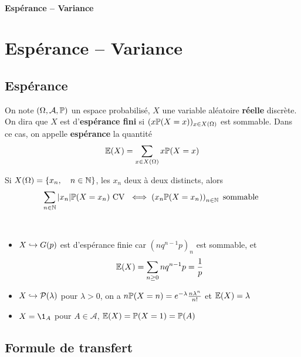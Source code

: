 \ifsolo
    ~

    \vspace{1cm}

    \begin{center}
        \textbf{\LARGE Espérance -- Variance} \\[1em]
    \end{center}
    \tableofcontents
\else
    \chapter{Espérance -- Variance}

    \minitoc
\fi
\thispagestyle{empty}

\section{Espérance}

\begin{dfn}
    On note $(\Omega, \mathcal  A, \P)$ un espace probabilisé, $X$ une variable aléatoire \textbf{réelle} discrète. On dira que $X$ est d'\textbf{espérance fini} si  $(x\P(X=x))_{x\in X(\Omega)}$ est sommable. Dans ce cas, on appelle \textbf{espérance} la quantité \[
        \E(X)= \sum_{x \in  X(\Omega)}x\P(X=x)
    \] 
\end{dfn}

\begin{rem}[Rappel]
    Si $X(\Omega)=\{x_n,\quad n\in \N\} $, les $x_n$ deux à deux distincts, alors  \[
        \sum_{n\in \N}|x_n|\P(X=x_n) \text{ CV } \iff \left( x_n\P(X=x_n) \right)_{n \in  \N}\text{ sommable }
    \]
\end{rem}

\begin{ex}~
    \begin{itemize}
        \item $X\suit G(p)$ est d'espérance finie car  $(nq^{n-1}p)_n$ est sommable, et \[
                \E(X)=\sum_{n\geq 0}nq^{n-1}p=\frac{1}{p}
        \] 
    \item $X\suit \mathcal  P(\lambda)$ pour $\lambda>0$, on a  $n\P(X=n)=e^{-\lambda}\frac{n\lambda^n}{n!}$ et $ \E(X)=\lambda$
    \item $X=\1_A$ pour  $A\in \mathcal  A$, $\E(X)=\P(X=1)=\P(A)$
    \end{itemize}
\end{ex}

\section{Formule de transfert}


